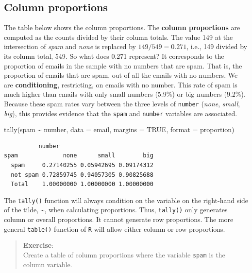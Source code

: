 \documentclass[
  letterpaper,
  DIV=11,
  numbers=noendperiod]{scrreprt}
\newenvironment{Shaded}{\begin{snugshade}}{\end{snugshade}}
\newcommand{\AttributeTok}[1]{\textcolor[rgb]{0.40,0.45,0.13}{#1}}
\newcommand{\ConstantTok}[1]{\textcolor[rgb]{0.56,0.35,0.01}{#1}}
\newcommand{\FunctionTok}[1]{\textcolor[rgb]{0.28,0.35,0.67}{#1}}
\newcommand{\NormalTok}[1]{\textcolor[rgb]{0.00,0.23,0.31}{#1}}
\newcommand{\SpecialCharTok}[1]{\textcolor[rgb]{0.37,0.37,0.37}{#1}}
\newcommand{\StringTok}[1]{\textcolor[rgb]{0.13,0.47,0.30}{#1}}
\begin{document}
\subsection{Column proportions}\label{column-proportions}

The table below shows the column proportions. The \textbf{column
proportions} are computed as the counts divided by their column totals.
The value 149 at the intersection of \emph{spam} and \emph{none} is
replaced by \(149 / 549 = 0.271\), i.e., 149 divided by its column
total, 549. So what does 0.271 represent? It corresponds to the
proportion of emails in the sample with no numbers that are spam. That
is, the proportion of emails that are spam, out of all the emails with
no numbers. We are \textbf{conditioning}, restricting, on emails with no
number. This rate of spam is much higher than emails with only small
numbers (5.9\%) or big numbers (9.2\%). Because these spam rates vary
between the three levels of \texttt{number} (\emph{none}, \emph{small},
\emph{big}), this provides evidence that the \texttt{spam} and
\texttt{number} variables are associated.

\begin{Shaded}
\begin{Highlighting}[]
\FunctionTok{tally}\NormalTok{(spam }\SpecialCharTok{\textasciitilde{}}\NormalTok{ number, }\AttributeTok{data =}\NormalTok{ email, }\AttributeTok{margins =} \ConstantTok{TRUE}\NormalTok{, }\AttributeTok{format =} \StringTok{\textquotesingle{}proportion\textquotesingle{}}\NormalTok{)}
\end{Highlighting}
\end{Shaded}

\begin{verbatim}
          number
spam             none      small        big
  spam     0.27140255 0.05942695 0.09174312
  not spam 0.72859745 0.94057305 0.90825688
  Total    1.00000000 1.00000000 1.00000000
\end{verbatim}

The \texttt{tally()} function will always condition on the variable on
the right-hand side of the tilde, \textasciitilde, when calculating
proportions. Thus, \texttt{tally()} only generates column or overall
proportions. It cannot generate row proportions. The more general
\texttt{table()} function of \texttt{R} will allow either column or row
proportions.

\begin{quote}
\textbf{Exercise}:\\
Create a table of column proportions where the variable \texttt{spam} is
the column variable.
\end{quote}
\end{document}
